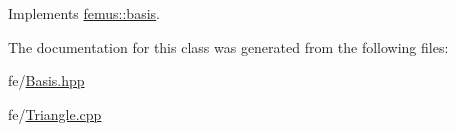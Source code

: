 Implements \mbox{\hyperlink{classfemus_1_1basis_abbae7bf8f31ec5793c911bc6d4ea0572}{femus\+::basis}}.



The documentation for this class was generated from the following files\+:\begin{DoxyCompactItemize}
\item 
fe/\mbox{\hyperlink{_basis_8hpp}{Basis.\+hpp}}\item 
fe/\mbox{\hyperlink{_triangle_8cpp}{Triangle.\+cpp}}\end{DoxyCompactItemize}
